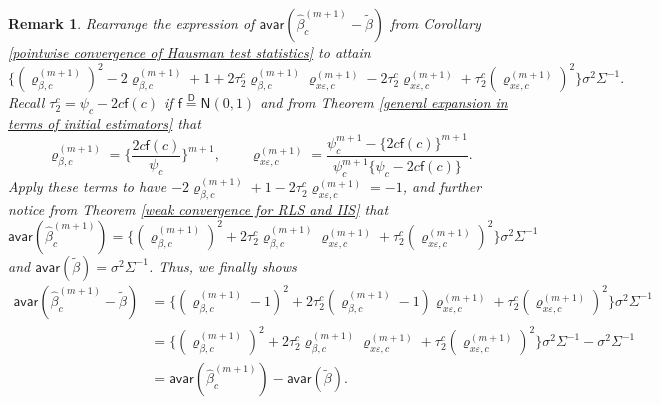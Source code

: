 \documentclass[11pt, letterpaper]{article}
\newtheorem{remark}{Remark}
\numberwithin{algorithm}{section}
\numberwithin{assumption}{section}
\numberwithin{lemma}{section}
\numberwithin{theorem}{section}
\numberwithin{corollary}{section}
\numberwithin{remark}{section}
\numberwithin{equation}{section}
\numberwithin{figure}{section}
\numberwithin{table}{section}
\begin{document}
\begin{remark} \label{asymptotic variance of difference equals the difference of respective variances}
Rearrange the expression of $\mathsf{avar}(\widehat{\beta}_{c}^{(m + 1)} - \widetilde{\beta})$ from Corollary \ref{pointwise convergence of Hausman test statistics} to attain
\begin{equation*}
\{ (\varrho_{\beta, c}^{(m + 1)})^{2} - 2 \varrho_{\beta, c}^{(m + 1)} + 1 + 2 \tau_{2}^{c} \varrho_{\beta, c}^{(m + 1)} \varrho_{x \varepsilon, c}^{(m + 1)} - 2 \tau_{2}^{c} \varrho_{x \varepsilon, c}^{(m + 1)} + \tau_{2}^{c} (\varrho_{x \varepsilon, c}^{(m + 1)})^{2} \} \sigma^{2} \Sigma^{-1}.
\end{equation*}
Recall $\tau_{2}^{c} = \psi_{c} - 2 c \mathsf{f}(c)$ if $\mathsf{f} \overset{\mathsf{D}}{=} \mathsf{N}(0, 1)$ and from Theorem \ref{general expansion in terms of initial estimators} that
\begin{equation*}
\varrho_{\beta, c}^{(m + 1)} = \{ \frac{2c \mathsf{f}(c)}{\psi_{c}} \}^{m + 1}, \qquad \varrho_{x \varepsilon, c}^{(m + 1)} = \frac{\psi_{c}^{m + 1} - \{ 2 c \mathsf{f}(c) \}^{m + 1}}{\psi_{c}^{m + 1} \{ \psi_{c} - 2 c \mathsf{f}(c) \}}.
\end{equation*}
Apply these terms to have $- 2 \varrho_{\beta, c}^{(m + 1)} + 1 - 2 \tau_{2}^{c} \varrho_{x \varepsilon, c}^{(m + 1)} = -1$, and further notice from Theorem \ref{weak convergence for RLS and IIS} that $\mathsf{avar}(\widehat{\beta}_{c}^{(m + 1)}) = \{ (\varrho_{\beta, c}^{(m + 1)})^{2} + 2 \tau_{2}^{c} \varrho_{\beta, c}^{(m + 1)} \varrho_{x \varepsilon, c}^{(m + 1)} + \tau_{2}^{c} (\varrho_{x \varepsilon, c}^{(m + 1)})^{2} \} \sigma^{2} \Sigma^{-1}$ and $\mathsf{avar}(\widetilde{\beta}) = \sigma^{2} \Sigma^{-1}$. Thus, we finally shows
\begin{align*}
\mathsf{avar}(\widehat{\beta}_{c}^{(m + 1)} - \widetilde{\beta}) & = \{ (\varrho_{\beta, c}^{(m + 1)} - 1)^{2} + 2 \tau_{2}^{c} (\varrho_{\beta, c}^{(m + 1)} - 1) \varrho_{x \varepsilon, c}^{(m + 1)} + \tau_{2}^{c} (\varrho_{x \varepsilon, c}^{(m + 1)})^{2} \} \sigma^{2} \Sigma^{-1} \\
& = \{ (\varrho_{\beta, c}^{(m + 1)})^{2} + 2 \tau_{2}^{c} \varrho_{\beta, c}^{(m + 1)} \varrho_{x \varepsilon, c}^{(m + 1)} + \tau_{2}^{c} (\varrho_{x \varepsilon, c}^{(m + 1)})^{2} \} \sigma^{2} \Sigma^{-1} - \sigma^{2} \Sigma^{-1} \\
& = \mathsf{avar}(\widehat{\beta}_{c}^{(m + 1)}) - \mathsf{avar}(\widetilde{\beta}).
\end{align*}
\end{remark}
\end{document}
